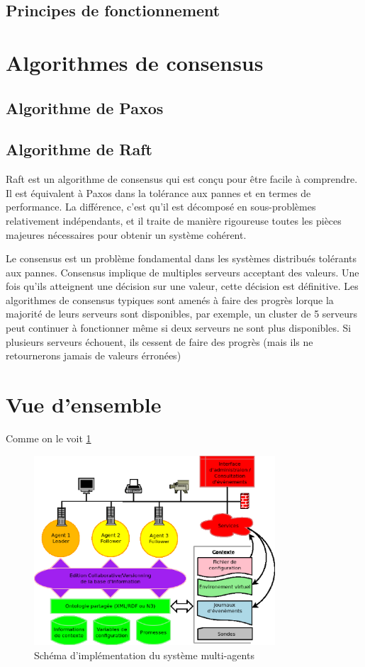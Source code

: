 \subsection{Principes de fonctionnement}

\section{Algorithmes de consensus}

\subsection{Algorithme de Paxos}

\subsection{Algorithme de Raft}

Raft est un algorithme de consensus qui est conçu pour être facile à comprendre.
Il est équivalent à Paxos dans la tolérance aux pannes et en termes de
performance. La différence, c'est qu'il est décomposé en sous-problèmes
relativement indépendants, et il traite de manière rigoureuse toutes les pièces
majeures nécessaires pour obtenir un système cohérent.

Le consensus est un problème fondamental dans les systèmes distribués tolérants
aux pannes. Consensus implique de multiples serveurs acceptant des valeurs. Une
fois qu'ils atteignent une décision sur une valeur, cette décision est
définitive. Les algorithmes de consensus typiques  sont amenés à faire des
progrès lorque la majorité de leurs serveurs sont disponibles, par exemple, un
cluster de 5 serveurs peut continuer à fonctionner même si deux serveurs ne sont
plus disponibles. Si plusieurs serveurs échouent, ils cessent de faire des
progrès (mais ils ne retournerons jamais de valeurs érronées)

\section{Vue d'ensemble}

Comme on le voit \ref{archi}

\begin{figure}[ht!]
  \centering
  \includegraphics[width=90mm]{img/archi}
  \caption{Schéma d'implémentation du système multi-agents}
  \label{archi}
\end{figure}
